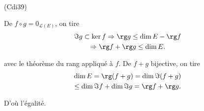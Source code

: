\begin{tiny}(Cdi39)\end{tiny} De $f \circ g = 0_{\mathcal{L}(E)}$, on tire
\begin{multline*}
 \Im g \subset \ker f 
 \Rightarrow \rg g \leq \dim E - \rg f \\
 \Rightarrow \rg f + \rg g  \leq \dim E.
\end{multline*}

avec le théorème du rang appliqué à $f$. De $f+g$ bijective, on tire
\begin{multline*}
 \dim E = \rg(f+g) = \dim \Im(f+g)\\
 \leq \dim \Im f + \dim \Im g 
 = \rg f + \rg g.
\end{multline*}

D'où l'égalité.
